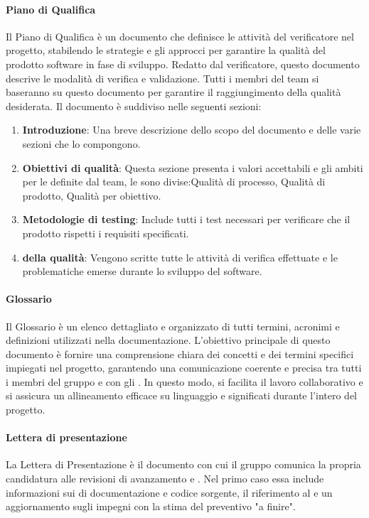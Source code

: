 \paragraph{Piano di Qualifica}
Il Piano di Qualifica è un documento che definisce le attività del verificatore nel progetto, stabilendo le strategie e gli approcci per garantire la qualità del prodotto software in fase di sviluppo. Redatto dal verificatore, questo documento descrive le modalità di verifica e validazione. Tutti i membri del team si baseranno su questo documento per garantire il raggiungimento della qualità desiderata.
Il documento è suddiviso nelle seguenti sezioni: 
\begin{enumerate}
    \item \textbf{Introduzione}: Una breve descrizione dello scopo del documento e delle varie sezioni che lo compongono.
    \item \textbf{Obiettivi di qualità}: Questa sezione presenta i valori accettabili e gli ambiti per le  definite dal team, le  sono divise:Qualità di processo, Qualità di prodotto, Qualità per obiettivo.
    \item \textbf{Metodologie di testing}: Include tutti i test necessari per verificare che il prodotto rispetti i requisiti specificati.
    \item \textbf{ della qualità}: Vengono scritte tutte le attività di verifica effettuate e le problematiche emerse durante lo sviluppo del software.
\end{enumerate}

\paragraph{Glossario}
Il Glossario è un elenco dettagliato e organizzato di tutti termini, acronimi e definizioni utilizzati nella documentazione. L’obiettivo principale di questo documento è fornire una comprensione chiara dei concetti e dei termini specifici impiegati nel progetto, garantendo una comunicazione coerente e precisa tra tutti i membri del gruppo e con gli . In questo modo, si facilita il lavoro collaborativo e si assicura un allineamento efficace su linguaggio e significati durante l'intero  del progetto.

\paragraph{Lettera di presentazione}
La Lettera di Presentazione è il documento con cui il gruppo comunica la propria candidatura alle revisioni di avanzamento  e . Nel primo caso essa include informazioni sui  di documentazione e codice sorgente, il riferimento al  e un aggiornamento sugli impegni con la stima del preventivo "a finire". 